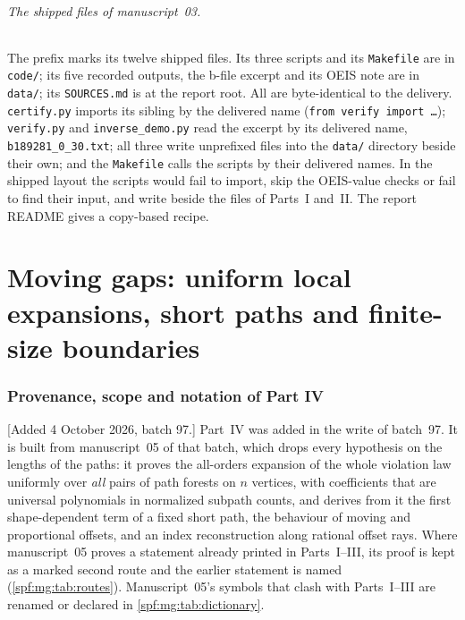 \documentclass[11pt]{article}
\numberwithin{equation}{section}
\theoremstyle{definition}
\theoremstyle{remark}
\theoremstyle{definition}
\begin{document}
\paragraph{The shipped files of manuscript~03.} The prefix
 marks its twelve shipped files. Its three scripts and its
\texttt{Makefile} are in \texttt{code/}; its five recorded outputs, the
b-file excerpt and its OEIS note are in \texttt{data/}; its
\texttt{SOURCES.md} is at the report root. All are byte-identical to the
delivery. \texttt{certify.py} imports its sibling by the delivered name
(\texttt{from verify import \ldots}); \texttt{verify.py} and
\texttt{inverse\_demo.py} read the excerpt by its delivered name,
\texttt{b189281\_0\_30.txt}; all three write unprefixed files into the
\texttt{data/} directory beside their own; and the \texttt{Makefile} calls
the scripts by their delivered names. In the shipped layout the scripts
would fail to import, skip the OEIS-value checks or fail to find their
input, and write beside the files of Parts~I and~II. The report README
gives a copy-based recipe.

\part{Moving gaps: uniform local expansions, short paths and finite-size boundaries}
\label{spf:mg:part}

\section{Provenance, scope and notation of Part IV}
\label{spf:mg:sec:front}

[Added 4 October 2026, batch 97.] Part~IV was added in the write of
batch~97. It is built from manuscript~05 of that batch, which drops every
hypothesis on the lengths of the paths: it proves the all-orders expansion of
the whole violation law uniformly over \emph{all} pairs of path forests on
$n$ vertices, with coefficients that are universal polynomials in normalized
subpath counts, and derives from it the first shape-dependent term of a fixed
short path, the behaviour of moving and proportional offsets, and an index
reconstruction along rational offset rays. Where manuscript~05 proves a
statement already printed in Parts~I--III, its proof is kept as a marked second
route and the earlier statement is named (\cref{spf:mg:tab:routes}).
Manuscript~05's symbols that clash with Parts~I--III are renamed or declared in
\cref{spf:mg:tab:dictionary}.
\end{document}
